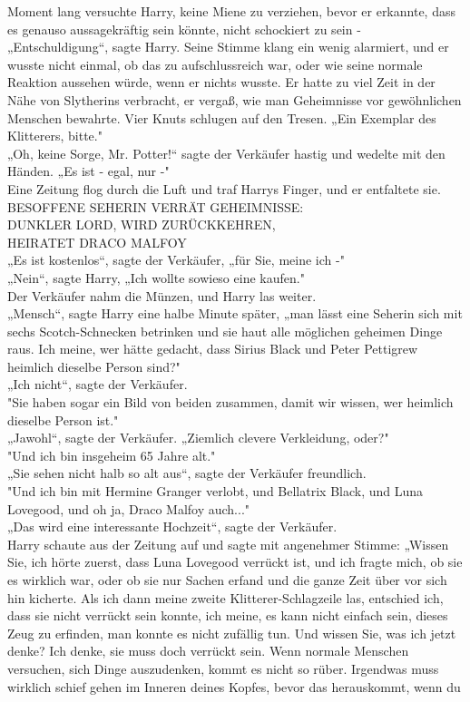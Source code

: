 {Moment lang versuchte Harry, keine Miene zu verziehen, bevor er erkannte, dass es genauso aussagekräftig sein könnte, nicht schockiert zu sein -\\ „Entschuldigung“, sagte Harry. Seine Stimme klang ein wenig alarmiert, und er wusste nicht einmal, ob das zu aufschlussreich war, oder wie seine normale Reaktion aussehen würde, wenn er nichts wusste. Er hatte zu viel Zeit in der Nähe von Slytherins verbracht, er vergaß, wie man Geheimnisse vor gewöhnlichen Menschen bewahrte. Vier Knuts schlugen auf den Tresen. „Ein Exemplar des Klitterers, bitte."\\ „Oh, keine Sorge, Mr. Potter!“ sagte der Verkäufer hastig und wedelte mit den Händen. „Es ist - egal, nur -"\\ Eine Zeitung flog durch die Luft und traf Harrys Finger, und er entfaltete sie.\\ BESOFFENE SEHERIN VERRÄT GEHEIMNISSE:\\ DUNKLER LORD, WIRD ZURÜCKKEHREN,\\ HEIRATET DRACO MALFOY\\ „Es ist kostenlos“, sagte der Verkäufer, „für Sie, meine ich -"\\ „Nein“, sagte Harry, „Ich wollte sowieso eine kaufen."\\ Der Verkäufer nahm die Münzen, und Harry las weiter.\\ „Mensch“, sagte Harry eine halbe Minute später, „man lässt eine Seherin sich mit sechs Scotch-Schnecken betrinken und sie haut alle möglichen geheimen Dinge raus. Ich meine, wer hätte gedacht, dass Sirius Black und Peter Pettigrew heimlich dieselbe Person sind?"\\ „Ich nicht“, sagte der Verkäufer.\\ "Sie haben sogar ein Bild von beiden zusammen, damit wir wissen, wer heimlich dieselbe Person ist."\\ „Jawohl“, sagte der Verkäufer. „Ziemlich clevere Verkleidung, oder?"\\ "Und ich bin insgeheim 65 Jahre alt."\\ „Sie sehen nicht halb so alt aus“, sagte der Verkäufer freundlich.\\ "Und ich bin mit Hermine Granger verlobt, und Bellatrix Black, und Luna Lovegood, und oh ja, Draco Malfoy auch..."\\ „Das wird eine interessante Hochzeit“, sagte der Verkäufer.\\ Harry schaute aus der Zeitung auf und sagte mit angenehmer Stimme: „Wissen Sie, ich hörte zuerst, dass Luna Lovegood verrückt ist, und ich fragte mich, ob sie es wirklich war, oder ob sie nur Sachen erfand und die ganze Zeit über vor sich hin kicherte. Als ich dann meine zweite Klitterer-Schlagzeile las, entschied ich, dass sie nicht verrückt sein konnte, ich meine, es kann nicht einfach sein, dieses Zeug zu erfinden, man konnte es nicht zufällig tun. Und wissen Sie, was ich jetzt denke? Ich denke, sie muss doch verrückt sein. Wenn normale Menschen versuchen, sich Dinge auszudenken, kommt es nicht so rüber. Irgendwas muss wirklich schief gehen im Inneren deines Kopfes, bevor das herauskommt, wenn du }
